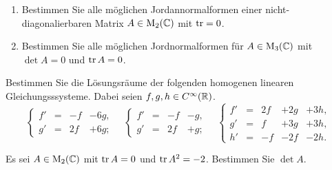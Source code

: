 \begin{question}{1}
  \begin{enumerate}[leftmargin=*]
    \item
      Bestimmen Sie alle möglichen Jordannormalformen einer nicht-diagonalierbaren Matrix $A \in \operatorname{M}_2(\mathbb{C})$ mit $\operatorname{tr} = 0$.
    \item
      Bestimmen Sie alle möglichen Jordnormalformen für $A \in \operatorname{M}_3(\mathbb{C})$ mit $\det A = 0$ und $\operatorname{tr} A = 0$.
  \end{enumerate}
\end{question}


\begin{question}[subtitle = Lösen linearer homogener DGL]{1}
  Bestimmen Sie die Lösungsräume der folgenden homogenen linearen Gleichungsssysteme.
  Dabei seien $f, g, h \in C^\infty(\mathbb{R})$.
  \[
    \left\{
      \begin{array}{ccrr}
        f'  & = & -f  & - 6g, \\
        g'  & = & 2f  & + 6g;
      \end{array}
    \right.
    \quad
    \left\{
      \begin{array}{ccrr}
        f'  & = & -f  & - g,  \\
        g'  & = & 2f  & + g;
      \end{array}
    \right.
    \quad
    \left\{
      \begin{array}{ccrrr}
        f'  & = & 2f  & + 2g  & + 3h, \\
        g'  & = &  f  & + 3g  & + 3h, \\
        h'  & = & -f  & - 2f  & - 2h.
      \end{array}
    \right.
  \]
\end{question}







\begin{question}{2}
  Es sei $A \in \operatorname{M}_2(\mathbb{C})$ mit $\operatorname{tr} A = 0$ und $\operatorname{tr} A^2 = -2$.
  Bestimmen Sie $\det A$.
\end{question}


